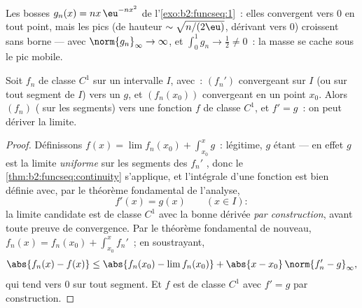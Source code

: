 \begin{omfigure}

{\small Les bosses $g_n(x) = nx\,\eu^{-nx^2}$ de
l'\cref{exo:b2:funcseq:1}~: elles convergent vers $0$ en tout point,
mais les pics (de hauteur $\sim\sqrt{n/(2\eu)}$, dérivant vers
$0$) croissent sans borne ---  avec
$\norm{g_n}_\infty \to \infty$, et $\int_0^1 g_n \to \frac12
\neq 0$~: la masse se cache sous le pic mobile.}
\end{omfigure}

\begin{theorem}[Dérivation]\label{thm:b2:funcseq:differentiation}
Soit $f_n$ de classe $C^1$ sur un intervalle $I$, avec~: $(f_n')$
convergeant \emph{} sur $I$ (ou sur tout segment de $I$)
vers un $g$, et $(f_n(x_0))$ convergeant en un point $x_0$. Alors
$(f_n)$  ( sur les segments) vers une fonction $f$
de classe $C^1$, et $f' = g$~: on peut dériver la limite.
\end{theorem}

\begin{proof}
Définissons $f(x) = \lim f_n(x_0) + \int_{x_0}^x g$~: légitime, $g$
étant  --- en effet $g$ est la limite \emph{uniforme} sur les
segments des $f_n'$ , donc le
\cref{thm:b2:funcseq:continuity} s'applique, et l'intégrale d'une
fonction  est bien définie avec, par le théorème fondamental
de l'analyse,
\[
f'(x) = g(x) \qquad (x \in I) :
\]
la limite candidate est de classe $C^1$ avec la bonne dérivée
\emph{par construction}, avant toute preuve de convergence. Par le
théorème fondamental de nouveau, $f_n(x) = f_n(x_0) + \int_{x_0}^x
f_n'$~; en soustrayant,
\[
\abs{f_n(x) - f(x)} \leq \abs{f_n(x_0) - \lim f_n(x_0)}
+ \abs{x - x_0}\,\norm{f_n' - g}_{\infty} ,
\]
qui tend vers $0$  sur tout segment. Et $f$ est de classe
$C^1$ avec $f' = g$ par construction.
\end{proof}


